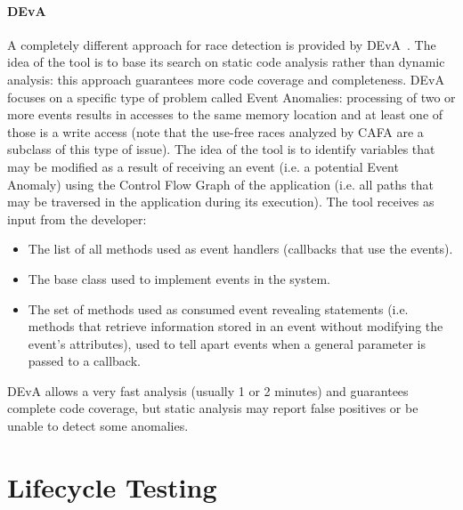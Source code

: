 \documentclass[11pt,a4paper,notitlepage]{article}
\begin{document}
\subsection{DEvA}
A completely different approach for race detection is provided by DEvA~\cite{Safi:2015:DEA:2786805.2786836}. The idea of the tool is to base its search on static code analysis rather than dynamic analysis: this approach guarantees more code coverage and completeness. DEvA focuses on a specific type of problem called Event Anomalies: processing of two or more events results in accesses to the same memory location and at least one of those is a write access (note that the use-free races analyzed by CAFA are a subclass of this type of issue). The idea of the tool is to identify variables that may be modified as a result of receiving an event (i.e. a potential Event Anomaly) using the Control Flow Graph of the application (i.e. all paths that may be traversed in the application during its execution). The tool receives as input from the developer:
\begin{itemize}
	\item The list of all methods used as event handlers (callbacks that use the events).
	\item The base class used to implement events in the system.
	\item The set of methods used as consumed event revealing statements (i.e. methods that retrieve information stored in an event without modifying the event's attributes), used to tell apart events when a general parameter is passed to a callback.
\end{itemize}
DEvA allows a very fast analysis (usually 1 or 2 minutes) and guarantees complete code coverage, but static analysis may report false positives or be unable to detect some anomalies.



\newpage
\part{Lifecycle Testing}\label{part_lifecycle}
\end{document}
